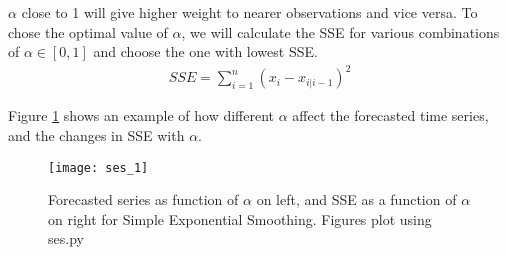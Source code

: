 \documentclass[../../time_series_notes.tex]{subfiles}
\begin{document}
$\alpha$ close to 1 will give higher weight to nearer observations and vice versa. To chose the optimal value of $\alpha$, we will calculate the SSE for various combinations of $\alpha \in [0,1]$ and choose the one with lowest SSE.
\begin{align*}
    SSE = \sum_{i=1}^{n}(x_{i} - x_{i|i-1})^{2}
\end{align*}

Figure \ref{fig:ses_1} shows an example of how different $\alpha$ affect the forecasted time series, and the changes in SSE with $\alpha$.

\begin{figure}[h]
    \texttt{[image: ses\_1]}
    \centering
    \caption {Forecasted series as function of $\alpha$ on left, and SSE as a function of $\alpha$ on right for Simple Exponential Smoothing. Figures plot using ses.py}
    \label{fig:ses_1} %
\end{figure}
\end{document}
